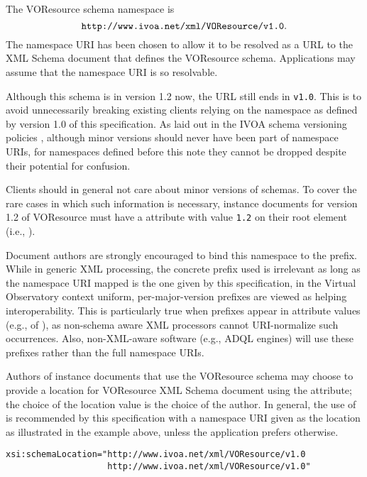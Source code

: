\documentclass[11pt,a4paper]{ivoa}
\begin{document}
\label{sect:namespace}


The VOResource schema namespace is
$$\hbox{\texttt{http://www.ivoa.net/xml/VOResource/v1.0}}.$$
The namespace URI has been chosen to allow it to be resolved as a URL
to the XML Schema document that defines the VOResource schema.
Applications may assume that the namespace URI is so resolvable.

Although this schema is in version 1.2 now, the URL still ends in
\texttt{v1.0}.  This is to avoid unnecessarily breaking existing clients
relying on the namespace as defined by version 1.0 of this
specification.  As laid out in the IVOA schema versioning policies
\citep{2018ivoa.spec.0529H}, although minor versions should never have
been part of namespace URIs, for namespaces defined before this note
they cannot be dropped despite their potential for confusion.

Clients should in general not care about minor versions of schemas.
To cover
the rare cases in which  such information is necessary, instance documents
for version 1.2 of VOResource must have a  attribute
with value \texttt{1.2} on their root element (i.e., ).

Document authors are strongly encouraged to bind this namespace to the
 prefix.  While in generic XML processing, the concrete
prefix used is irrelevant as long as the namespace URI mapped is the one
given by this specification, in the Virtual Observatory context uniform,
per-major-version prefixes are viewed as helping interoperability.  This
is particularly true when prefixes appear in attribute values (e.g.,
of ), as non-schema aware XML processors cannot
URI-normalize such occurrences.  Also, non-XML-aware software (e.g., ADQL
engines) will use these prefixes rather than the full namespace URIs.

Authors of instance documents that use the VOResource schema may choose
to provide a location for VOResource XML Schema document using the
 attribute; the choice of the location value
is the choice of the author.  In general, the use of
 is recommended by this specification with
a namespace URI given as the location as illustrated in the example
above, unless the application prefers otherwise.


\begin{verbatim}
xsi:schemaLocation="http://www.ivoa.net/xml/VOResource/v1.0
                    http://www.ivoa.net/xml/VOResource/v1.0"
\end{verbatim}
\end{document}
